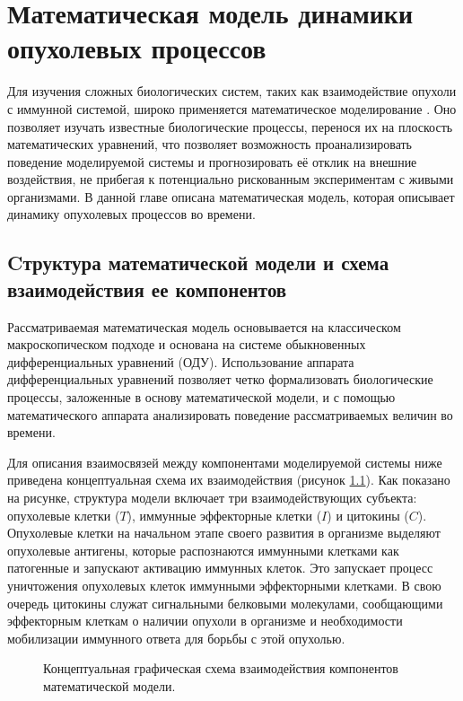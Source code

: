 \chapter{Математическая модель динамики опухолевых процессов}

Для изучения сложных биологических систем, таких как взаимодействие опухоли с
иммунной системой, широко применяется математическое моделирование
\cite{murray_mathematical_biology, perelson1997}. Оно позволяет изучать известные
биологические процессы, перенося их на плоскость математических уравнений, что
позволяет возможность проанализировать поведение моделируемой системы и
прогнозировать её отклик на внешние воздействия, не прибегая к потенциально
рискованным экспериментам с живыми организмами. В данной главе описана
математическая модель, которая описывает динамику опухолевых процессов во времени.

\section{Cтруктура математической модели и схема взаимодействия ее компонентов}

Рассматриваемая математическая модель основывается на классическом
макроскопическом подходе и основана на системе обыкновенных дифференциальных
уравнений (ОДУ). Использование аппарата дифференциальных уравнений позволяет
четко формализовать биологические процессы, заложенные в основу математической
модели, и с помощью математического аппарата анализировать поведение
рассматриваемых величин во времени.

Для описания взаимосвязей между компонентами моделируемой системы ниже
приведена концептуальная схема их взаимодействия (рисунок \ref{fig:model_scheme}).
Как показано на рисунке, структура модели включает три взаимодействующих субъекта:
опухолевые клетки ($T$), иммунные эффекторные клетки ($I$) и цитокины ($C$).
Опухолевые клетки на начальном этапе своего развития в организме выделяют
опухолевые антигены, которые распознаются иммунными клетками как патогенные и
запускают активацию иммунных клеток. Это запускает процесс уничтожения
опухолевых клеток иммунными эффекторными клетками. В свою очередь цитокины
служат сигнальными белковыми молекулами, сообщающими эффекторным клеткам о
наличии опухоли в организме и необходимости мобилизации иммунного ответа для
борьбы с этой опухолью.

\begin{figure}[ht!]
  \centering
  
  \caption{Концептуальная графическая схема взаимодействия
  компонентов математической модели.}
  \label{fig:model_scheme}
\end{figure}

